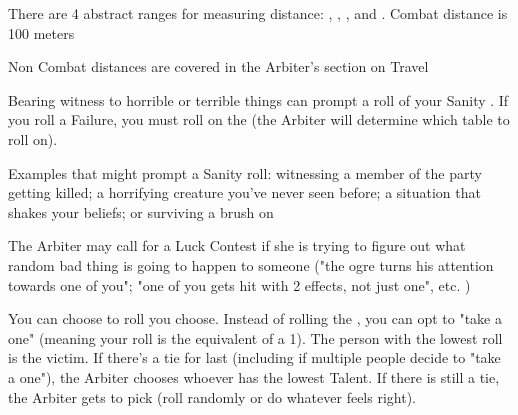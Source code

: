 {\cbreak


There are 4 abstract ranges for measuring distance:  , , , and  .  \MAX Combat distance is 100 meters




Non Combat distances are covered in the Arbiter's section on Travel





Bearing witness to horrible or terrible things can prompt a roll of your Sanity \UD.  If you roll a Failure, you must roll on the  (the Arbiter will determine which table to roll on). 

Examples that might prompt a Sanity roll:  witnessing a member of the party getting killed; a horrifying creature you've never seen before; a situation that shakes your beliefs; or surviving a brush on 



The Arbiter may call for a Luck Contest if she is trying to figure out what random bad thing is going to happen to someone ("the ogre turns his attention towards one of you"; "one of you gets hit with 2 effects, not just one", etc. )

You can choose to roll   \UD you choose.  Instead of rolling the \UD, you can opt to "take a one" (meaning your roll is the equivalent of a 1).  The person with the lowest roll is the victim. If there's a tie for last (including if multiple people decide to "take a one"), the Arbiter chooses whoever has the lowest Talent.  If there is still a tie, the Arbiter gets to pick (roll randomly or do whatever feels right).

\newpage

}
